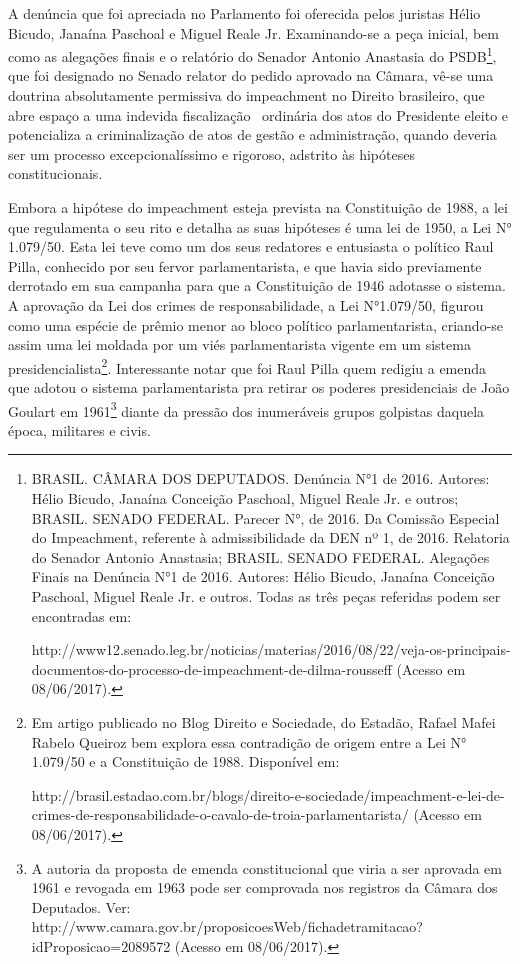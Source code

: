 A denúncia que foi apreciada no Parlamento foi oferecida pelos juristas
Hélio Bicudo, Janaína Paschoal e Miguel Reale Jr. Examinando-se a peça
inicial, bem como as alegações finais e o relatório do Senador Antonio
Anastasia do PSDB\footnote{BRASIL. CÂMARA DOS DEPUTADOS. Denúncia N°1 de
  2016. Autores: Hélio Bicudo, Janaína Conceição Paschoal, Miguel Reale
  Jr. e outros; BRASIL. SENADO FEDERAL. Parecer N°, de 2016. Da Comissão
  Especial do Impeachment, referente à admissibilidade da DEN nº 1, de
  2016. Relatoria do Senador Antonio Anastasia; BRASIL. SENADO FEDERAL.
  Alegações Finais na Denúncia N°1 de 2016. Autores: Hélio Bicudo,
  Janaína Conceição Paschoal, Miguel Reale Jr. e outros. Todas as três
  peças referidas podem ser encontradas em:

  http://www12.senado.leg.br/noticias/materias/2016/08/22/veja-os-principais-documentos-do-processo-de-impeachment-de-dilma-rousseff
  (Acesso em 08/06/2017).}, que foi designado no Senado relator do
pedido aprovado na Câmara, vê-se uma doutrina absolutamente permissiva
do impeachment no Direito brasileiro, que abre espaço a uma indevida
fiscalização~ ordinária dos atos do Presidente eleito e potencializa a
criminalização de atos de gestão e administração, quando deveria ser um
processo excepcionalíssimo e rigoroso, adstrito às hipóteses
constitucionais.

Embora a hipótese do impeachment esteja prevista na Constituição de
1988, a lei que regulamenta o seu rito e detalha as suas hipóteses é uma
lei de 1950, a Lei N° 1.079/50. Esta lei teve como um dos seus redatores
e entusiasta o político Raul Pilla, conhecido por seu fervor
parlamentarista, e que havia sido previamente derrotado em sua campanha
para que a Constituição de 1946 adotasse o sistema. A aprovação da Lei
dos crimes de responsabilidade, a Lei N°1.079/50, figurou como uma
espécie de prêmio menor ao bloco político parlamentarista, criando-se
assim uma lei moldada por um viés parlamentarista vigente em um sistema
presidencialista\footnote{Em artigo publicado no Blog Direito e
  Sociedade, do Estadão, Rafael Mafei Rabelo Queiroz bem explora essa
  contradição de origem entre a Lei N° 1.079/50 e a Constituição de
  1988. Disponível em:

  http://brasil.estadao.com.br/blogs/direito-e-sociedade/impeachment-e-lei-de-crimes-de-responsabilidade-o-cavalo-de-troia-parlamentarista/
  (Acesso em 08/06/2017).}. Interessante notar que foi Raul Pilla quem
redigiu a emenda que adotou o sistema parlamentarista pra retirar os
poderes presidenciais de João Goulart em 1961\footnote{A autoria da
  proposta de emenda constitucional que viria a ser aprovada em 1961 e
  revogada em 1963 pode ser comprovada nos registros da Câmara dos
  Deputados. Ver:
  http://www.camara.gov.br/proposicoesWeb/fichadetramitacao?idProposicao=2089572
  (Acesso em 08/06/2017).} diante da pressão dos inumeráveis grupos
golpistas daquela época, militares e civis.

